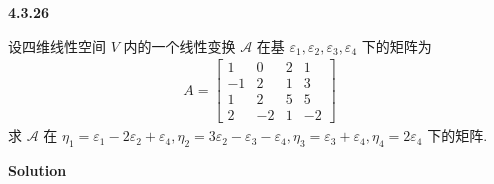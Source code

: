 \documentclass[11pt,a4paper,openany,oneside]{book}
\newcommand\Solution{\noindent\textbf{\textsf{Solution}}\par\medskip}
\begin{document}
\begin{myexample}
	\textbf{4.3.26}

设四维线性空间 $ V $ 内的一个线性变换 $ \mathcal{A} $ 在基 $ \varepsilon_1, \varepsilon_2, \varepsilon_3, \varepsilon_4 $ 下的矩阵为
\begin{gather*}
A =
\begin{bmatrix}
1  &  0  &  2  &  1  \\
-1  &  2  &  1  &  3  \\
1  &  2  &  5  &  5  \\
2  &  -2  &  1  &  -2
\end{bmatrix}
\end{gather*}
求 $ \mathcal{A} $ 在 $ \eta_1 = \varepsilon_1-2\varepsilon_2+\varepsilon_4, \eta_2 = 3\varepsilon_2-\varepsilon_3 - \varepsilon_4, \eta_3 = \varepsilon_3 + \varepsilon_4, \eta_4 = 2\varepsilon_4 $ 下的矩阵. \\  

\end{myexample}
\Solution
\end{document}
